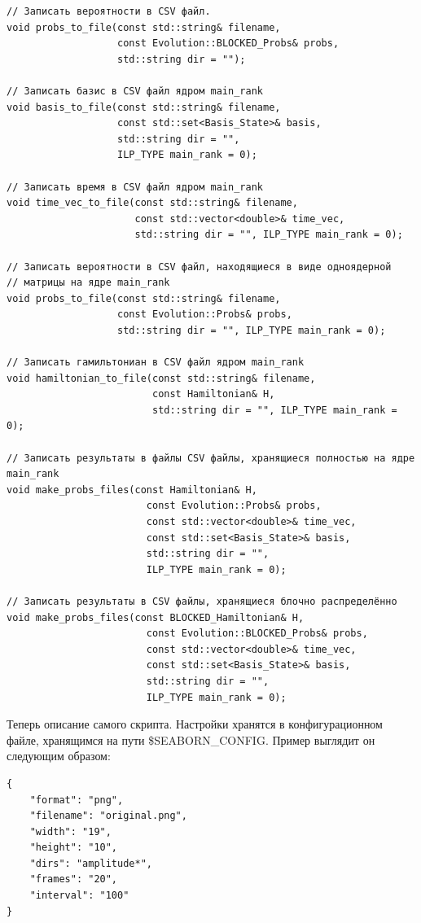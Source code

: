 \documentclass[12pt,fleqn]{article}
\begin{document}
\begin{mdframed}[linecolor=black, topline=true, bottomline=true,
leftline=false, rightline=false]
\begin{verbatim}
// Записать вероятности в CSV файл.
void probs_to_file(const std::string& filename,
                   const Evolution::BLOCKED_Probs& probs,
                   std::string dir = "");

// Записать базис в CSV файл ядром main_rank
void basis_to_file(const std::string& filename,
                   const std::set<Basis_State>& basis,
                   std::string dir = "",
                   ILP_TYPE main_rank = 0);

// Записать время в CSV файл ядром main_rank
void time_vec_to_file(const std::string& filename,
                      const std::vector<double>& time_vec,
                      std::string dir = "", ILP_TYPE main_rank = 0);

// Записать вероятности в CSV файл, находящиеся в виде одноядерной
// матрицы на ядре main_rank
void probs_to_file(const std::string& filename,
                   const Evolution::Probs& probs,
                   std::string dir = "", ILP_TYPE main_rank = 0);

// Записать гамильтониан в CSV файл ядром main_rank
void hamiltonian_to_file(const std::string& filename,
                         const Hamiltonian& H,
                         std::string dir = "", ILP_TYPE main_rank = 0);

// Записать результаты в файлы CSV файлы, хранящиеся полностью на ядре main_rank
void make_probs_files(const Hamiltonian& H,
                        const Evolution::Probs& probs,
                        const std::vector<double>& time_vec,
                        const std::set<Basis_State>& basis,
                        std::string dir = "",
                        ILP_TYPE main_rank = 0);

// Записать результаты в CSV файлы, хранящиеся блочно распределённо
void make_probs_files(const BLOCKED_Hamiltonian& H,
                        const Evolution::BLOCKED_Probs& probs,
                        const std::vector<double>& time_vec,
                        const std::set<Basis_State>& basis,
                        std::string dir = "",
                        ILP_TYPE main_rank = 0);

\end{verbatim}
\end{mdframed}

        Теперь описание самого скрипта. Настройки хранятся в конфигурационном файле, хранящимся на пути \textsf{\$SEABORN\_CONFIG}. Пример выглядит он следующим образом:

\begin{mdframed}[linecolor=black, topline=true, bottomline=true,
leftline=false, rightline=false]
\begin{verbatim}
{
    "format": "png",
    "filename": "original.png",
    "width": "19",
    "height": "10",
    "dirs": "amplitude*",
    "frames": "20",
    "interval": "100"
}

\end{verbatim}
\end{mdframed}
\end{document}
